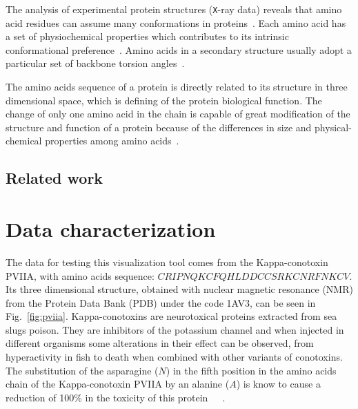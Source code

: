 \documentclass[10pt, conference]{IEEEtran}
\begin{document}
The analysis of experimental protein structures (\texttt{X}-ray data) reveals that amino acid residues can assume many conformations in proteins~\cite{Borguesan:2015}. Each amino acid has a set of physiochemical properties which contributes to its intrinsic conformational preference~\cite{Mathura:2005}. Amino acids in a secondary structure usually adopt a particular set of backbone torsion angles~\cite{Borguesan:2015}.

The amino acids sequence of a protein is directly related to its structure in three dimensional space, which is defining of the protein biological function. The change of only one amino acid in the chain is capable of great modification of the structure and function of a protein because of the differences in size and physical-chemical properties among amino acids~\cite{nelson2008lehninger}.

\subsection{Related work}
%


\section{Data characterization}

The data for testing this visualization tool comes from the Kappa-conotoxin PVIIA, with amino acids sequence: $CRIPNQKCFQHLDDCCSRKCNRFNKCV$. Its three dimensional structure, obtained with nuclear magnetic resonance (NMR) from the Protein Data Bank (PDB) under the code 1AV3, can be seen in Fig.~\ref{fig:pviia}. Kappa-conotoxins are neurotoxical proteins extracted from sea slugs poison. They are inhibitors of the potassium channel and when injected in different organisms some alterations in their effect can be observed, from hyperactivity in fish to death when combined with other variants of conotoxins. The substitution of the asparagine ($N$) in the fifth position in the amino acids chain of the Kappa-conotoxin PVIIA by an alanine ($A$) is know to cause a reduction of 100\% in the toxicity of this protein~\cite{jacobsen2000single}~\cite{mir2016conotoxins}~\cite{akey2002inherited}.
\end{document}
